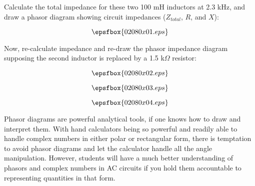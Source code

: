 

Calculate the total impedance for these two 100 mH inductors at 2.3 kHz, and draw a phasor diagram showing circuit impedances ($Z_{total}$, $R$, and $X$):

$$\epsfbox{02080x01.eps}$$

Now, re-calculate impedance and re-draw the phasor impedance diagram supposing the second inductor is replaced by a 1.5 k$\Omega$ resistor:

$$\epsfbox{02080x02.eps}$$







$$\epsfbox{02080x03.eps}$$

$$\epsfbox{02080x04.eps}$$







Phasor diagrams are powerful analytical tools, if one knows how to draw and interpret them.  With hand calculators being so powerful and readily able to handle complex numbers in either polar or rectangular form, there is temptation to avoid phasor diagrams and let the calculator handle all the angle manipulation.  However, students will have a much better understanding of phasors and complex numbers in AC circuits if you hold them accountable to representing quantities in that form.




